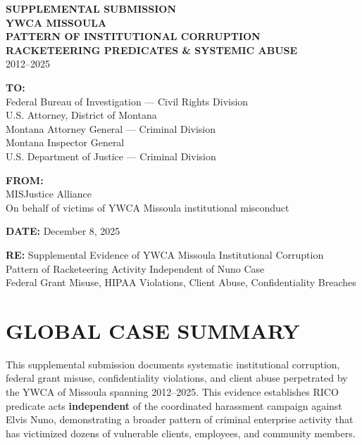 \documentclass[12pt,oneside]{article}
\begin{document}
\begin{center}
\vspace*{0.5in}
{\textbf{\Large SUPPLEMENTAL SUBMISSION}}
\vspace{0.2in}
\\
{\textbf{YWCA MISSOULA}}
\vspace{0.1in}
\\
{\textbf{PATTERN OF INSTITUTIONAL CORRUPTION}}
\vspace{0.1in}
\\
{\textbf{RACKETEERING PREDICATES \& SYSTEMIC ABUSE}}
\vspace{0.1in}
\\
2012--2025
\vspace{0.5in}
\end{center}

\begin{flushleft}
\textbf{TO:} \\
Federal Bureau of Investigation --- Civil Rights Division \\
U.S. Attorney, District of Montana \\
Montana Attorney General --- Criminal Division \\
Montana Inspector General \\
U.S. Department of Justice --- Criminal Division
\vspace{0.3in}

\textbf{FROM:} \\
MISJustice Alliance \\
On behalf of victims of YWCA Missoula institutional misconduct
\vspace{0.3in}

\textbf{DATE:} December 8, 2025
\vspace{0.3in}

\textbf{RE:} Supplemental Evidence of YWCA Missoula Institutional Corruption \\
Pattern of Racketeering Activity Independent of Nuno Case \\
Federal Grant Misuse, HIPAA Violations, Client Abuse, Confidentiality Breaches
\end{flushleft}

\newpage

\section*{GLOBAL CASE SUMMARY}

This supplemental submission documents systematic institutional corruption, federal grant misuse, confidentiality violations, and client abuse perpetrated by the YWCA of Missoula spanning 2012--2025. This evidence establishes RICO predicate acts \textbf{independent} of the coordinated harassment campaign against Elvis Nuno, demonstrating a broader pattern of criminal enterprise activity that has victimized dozens of vulnerable clients, employees, and community members.
\end{document}
